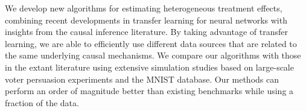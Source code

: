 We develop new algorithms for estimating heterogeneous treatment effects, combining recent developments in transfer learning for neural networks with insights from the causal inference literature. By taking advantage of transfer learning, we are able to efficiently use different data sources that are related to the same underlying causal mechanisms. We compare our algorithms with those in the extant literature using extensive simulation studies based on large-scale voter persuasion experiments and the MNIST database. Our methods can perform an order of magnitude better than existing benchmarks while using a fraction of the data.